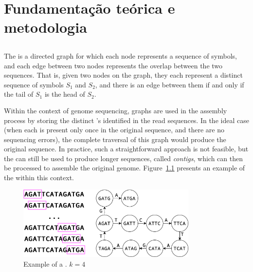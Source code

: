 \chapter{Fundamentação teórica e metodologia}

\section{\dBG}


The \dBG is a directed graph for which each node represents a sequence of symbols, and each edge between two nodes represents
the overlap between the two sequences. That is, given two nodes on the graph, they each represent a distinct sequence of symbols
$S_1$ and $S_2$, and there is an edge between them if and only if the tail of $S_1$ is the head of $S_2$.

Within the context of genome sequencing, \dB graphs are used in the assembly process by storing the distinct \kmer 's identified
in the read sequences. In the ideal case (when each \kmer is present only once in the original sequence, and there are no
sequencing errors), the complete traversal of this graph would produce the original sequence. In practice, such a straightforward
approach is not feasible, but the \dBG can still be used to produce longer sequences, called \emph{contigs}, which can then be processed
to assemble the original genome. Figure~\ref{fig:dbgexample} presents an example of the \dBG within this context.

\begin{figure}[htbp]
	\begin{center}
    \includegraphics[width=0.8\textwidth]{figures/dbg-example}
	\end{center}
	\caption{Example of a \dBG. $k=4$}\label{fig:dbgexample}
\end{figure}


